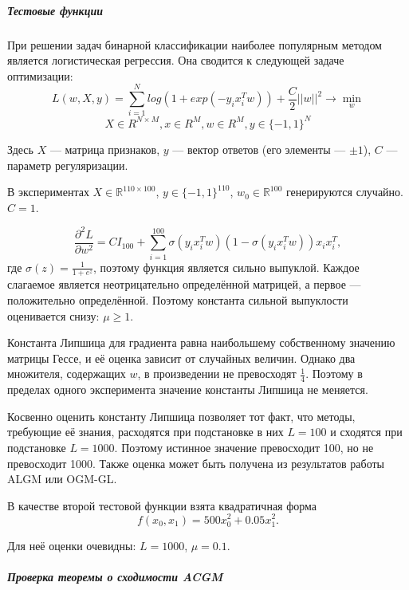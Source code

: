 \documentclass{crm-article}
\begin{document}
\subparagraph{Тестовые функции}

При решении задач бинарной классификации наиболее популярным методом является логистическая регрессия. Она сводится к следующей задаче оптимизации:
$$ L(w, X, y) = \sum_{i = 1}^{N} log (1 + exp(-y_ix_i^Tw)) + \frac{C}{2} ||w||^2 \longrightarrow \min_w$$
$$X \in R^{N \times M}, x \in R^{M}, w \in R^{M}, y \in \{-1, 1\}^N$$

Здесь $X$ --- матрица признаков, $y$ --- вектор ответов (его элементы --- $\pm 1$), $C$ --- параметр регуляризации.

В экспериментах $X\in \mathbb{R}^{110\times 100}$, $y\in \{-1,1\}^{110}$, $w_0\in\mathbb{R}^{100}$ генерируются случайно. $C=1$.

$$\frac{\partial^2 L}{\partial w^2}=CI_{100}+\sum_{i=1}^{100}\sigma(y_ix_i^Tw)(1-\sigma(y_ix_i^Tw))x_ix_i^T,$$ где $\sigma(z)=\frac{1}{1+e^z}$, поэтому функция является сильно выпуклой. Каждое слагаемое является неотрицательно определённой матрицей, а первое --- положительно определённой. Поэтому константа сильной выпуклости оценивается снизу: $\mu\geq 1$.

Константа Липшица для градиента равна наибольшему собственному значению матрицы Гессе, и её оценка зависит от случайных величин. Однако два множителя, содержащих $w$, в произведении не превосходят $\frac{1}{4}$. Поэтому в пределах одного эксперимента значение константы Липшица не меняется.

Косвенно оценить константу Липшица позволяет тот факт, что методы, требующие её знания, расходятся при подстановке в них $L=100$ и сходятся при подстановке $L=1000$. Поэтому истинное значение превосходит 100, но не превосходит 1000. Также оценка может быть получена из результатов работы ALGM или OGM-GL.

В качестве второй тестовой функции взята квадратичная форма $$f(x_0, x_1)=500x_0^2+0.05x_1^2.$$

Для неё оценки очевидны: $L=1000$, $\mu=0.1$.

\subparagraph{Проверка теоремы о сходимости ACGM}
\end{document}
